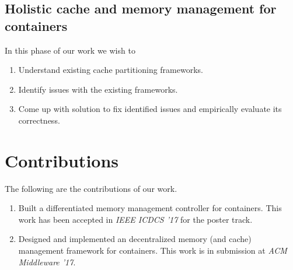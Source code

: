    \subsection{Holistic cache and memory management for containers}
      In this phase of our work we wish to
      \begin{enumerate}
	\item Understand existing cache partitioning frameworks.
	\item Identify issues with the existing frameworks.
	\item Come up with solution to fix identified issues and empirically evaluate its correctness.
      \end{enumerate}

  \section{Contributions}
    The following are the contributions of our work.  
      \begin{enumerate}
	\item Built a differentiated memory management controller for containers. This work has been 
	accepted in \textit{IEEE ICDCS '17} for the poster track.
	\item Designed and implemented an decentralized memory (and cache) management framework for containers. This work 
	is in submission at \textit{ACM Middleware '17}.
      \end{enumerate}

  
